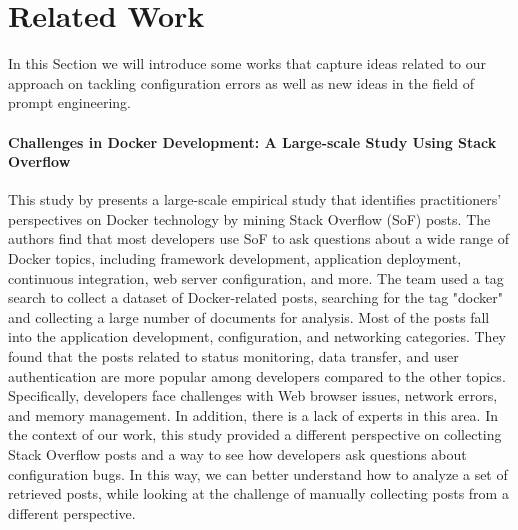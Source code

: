 \documentclass[english,bachelor]{swsLeipzig}
\begin{document}
\chapter{Related Work}\label{related_work}
In this Section we will introduce some works that capture ideas related to our approach on tackling configuration errors as well as new ideas in the field of prompt engineering.

\subsubsection{Challenges in Docker Development: A Large-scale Study Using Stack Overflow}
This study by \citet{haque:2020} presents a large-scale empirical study that identifies practitioners' perspectives on Docker technology by mining Stack Overflow (SoF) posts. The authors find that most developers use SoF to ask questions about a wide range of Docker topics, including framework development, application deployment, continuous integration, web server configuration, and more. The team used a tag search to collect a dataset of Docker-related posts, searching for the tag "docker" and collecting a large number of documents for analysis. Most of the posts fall into the application development, configuration, and networking categories. They found that the posts related to status monitoring, data transfer, and user authentication are more popular among developers compared to the other topics. Specifically, developers face challenges with Web browser issues, network errors, and memory management. In addition, there is a lack of experts in this area. In the context of our work, this study provided a different perspective on collecting Stack Overflow posts and a way to see how developers ask questions about configuration bugs. In this way, we can better understand how to analyze a set of retrieved posts, while looking at the challenge of manually collecting posts from a different perspective.
\end{document}

